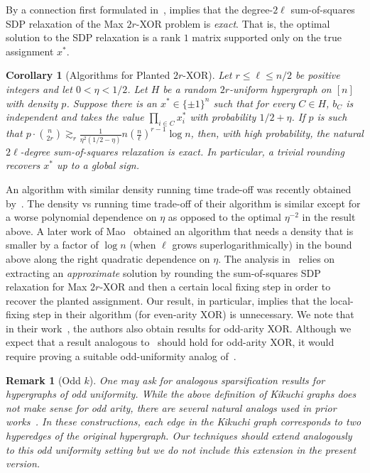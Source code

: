 \documentclass
[11pt,letterpaper]
{article}
\newtheorem{corollary}[theorem]{Corollary}
\newtheorem{remark}[theorem]{Remark}
\begin{document}
By a connection first formulated in~\cite{GHKM23},  implies that the degree-$2\ell$ sum-of-squares SDP relaxation of the Max $2r$-XOR problem is \emph{exact}. That is, the optimal solution to the SDP relaxation is a rank $1$ matrix supported only on the true assignment $x^*$. 

\begin{corollary}[Algorithms for Planted $2r$-XOR] \label{cor:planted-xor}
Let $r \leq \ell \leq n/2$ be positive integers and let $0<\eta<1/2$. Let $H$ be a random $2r$-uniform hypergraph on $[n]$ with density $p$. Suppose there is an $x^* \in \{ \pm 1 \}^n$ such that for every $C \in H$, $b_C$ is independent and takes the value $\prod_{i \in C} x^*_i$ with probability $1/2+ \eta$. If $p$ is such that $p \cdot {n \choose 2r} \gtrsim_r \frac{1}{\eta^2(1/2-\eta)} n (\frac{n}{\ell})^{r-1}\log n$, then, with high probability, the natural $2\ell$-degree sum-of-squares relaxation is \emph{exact}. In particular, a trivial rounding recovers $x^*$ up to a global sign.
\end{corollary}

An algorithm with similar density running time trade-off was recently obtained by~\cite{BasuHsiehLinManohar25}. The density vs running time trade-off of their algorithm is similar except for a worse polynomial dependence on $\eta$ as opposed to the optimal $\eta^{-2}$ in the result above. A later work of Mao~\cite{Mao26NoisyKXOR} obtained an algorithm that needs a density that is smaller by a factor of $\log n$ (when $\ell$ grows superlogarithmically) in the bound above along the right quadratic dependence on $\eta$. The analysis in~\cite{BasuHsiehLinManohar25} relies on extracting an \emph{approximate} solution by rounding the sum-of-squares SDP relaxation for Max $2r$-XOR and then a certain local fixing step in order to recover the planted assignment. Our result, in particular, implies that the local-fixing step in their algorithm (for even-arity XOR) is unnecessary. We note that in their work~\cite{BasuHsiehLinManohar25}, the authors also obtain results for odd-arity XOR. Although we expect that a result analogous to~ should hold for odd-arity XOR, it would require proving a suitable odd-uniformity analog of~. 

\begin{remark}[Odd $k$]
One may ask for analogous sparsification results for hypergraphs of odd uniformity. While the above definition of Kikuchi graphs does not make sense for odd arity, there are several natural analogs used in prior works~\cite{GuruswamiKM22,HsiehKM23,AlrabiahGKM22,HsiehKothariMohantyMunhaSudakov24,KothariManohar24LinearLCC}. In these constructions, each edge in the Kikuchi graph corresponds to \emph{two} hyperedges of the original hypergraph. Our techniques should extend analogously to this odd uniformity setting but we do not include this extension in the present version.
\end{remark}
\end{document}
